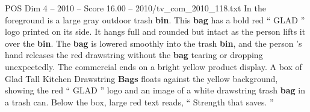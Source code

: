 \begin{textsample}{POS Dim 4 – 2010 – Score 16.00 – 2010/tv\_com\_2010\_118.txt}
In the foreground is a large gray outdoor trash \textbf{bin}.
This \textbf{bag} has a bold red “ GLAD ” logo printed on its side.
It hangs full and rounded but intact as the person lifts it over the \textbf{bin}.
The \textbf{bag} is lowered smoothly into the trash \textbf{bin}, and the person ’s hand releases the red drawstring without the \textbf{bag} tearing or dropping unexpectedly.
The commercial ends on a bright yellow product display.
A box of Glad Tall Kitchen Drawstring \textbf{Bags} floats against the yellow background, showing the red “ GLAD ” logo and an image of a white drawstring trash \textbf{bag} in a trash can.
Below the box, large red text reads, “ Strength that saves. ”

\end{textsample}
